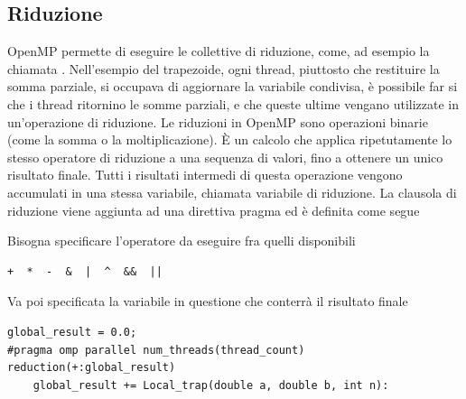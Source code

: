\documentclass[10pt, letterpaper]{report}
\begin{document}
\subsection{Riduzione}
OpenMP permette di eseguire le collettive di riduzione, come, ad esempio la chiamata . Nell'esempio del trapezoide, ogni thread, piuttosto che restituire la somma parziale, si occupava di aggiornare la variabile condivisa, è possibile far si che i thread ritornino le somme parziali, e che queste ultime  vengano utilizzate in un'operazione di riduzione. \acc 
Le riduzioni in OpenMP sono operazioni binarie (come la somma o la moltiplicazione). 
È un calcolo che applica ripetutamente lo stesso operatore di riduzione a una sequenza di valori, fino a ottenere un unico risultato finale.
Tutti i risultati intermedi di questa operazione vengono accumulati in una stessa variabile, chiamata variabile di riduzione.\acc 
La clausola di riduzione viene aggiunta ad una direttiva pragma  ed è definita come segue \begin{quote}
\end{quote}
Bisogna specificare l'operatore da eseguire fra quelli disponibili 
\begin{lstlisting}[style=CStyle]
    +  *  -  &  |  ^  &&  ||
\end{lstlisting}
Va poi specificata la variabile in questione che conterrà il risultato finale
\begin{lstlisting}[style=CStyle]
global_result = 0.0;
#pragma omp parallel num_threads(thread_count) reduction(+:global_result)
    global_result += Local_trap(double a, double b, int n):
\end{lstlisting}
\flowerLine
\end{document}
